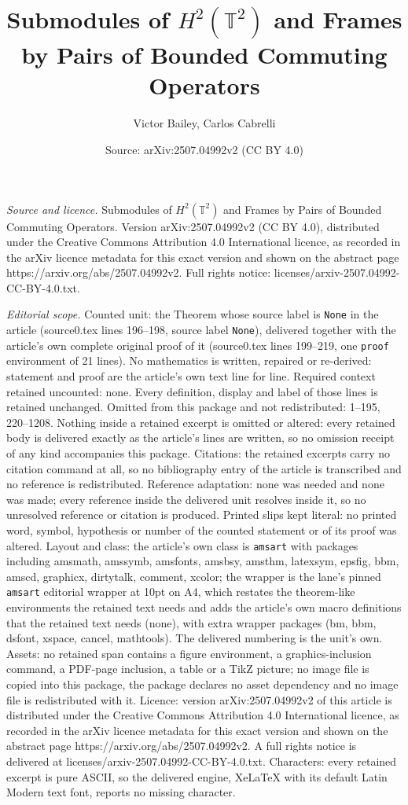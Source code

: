 \documentclass[10pt,a4paper]{amsart}
\title[Submodules of $H^2(\mathbb{T}^2)$ and Frames by Pairs of Bou]{Submodules of $H^2(\mathbb{T}^2)$ and Frames by Pairs of Bounded Commuting Operators}
\author{Victor Bailey, Carlos Cabrelli}
\date{Source: arXiv:2507.04992v2 (CC BY 4.0)}
\begin{document}
\maketitle

\noindent\emph{Source and licence.} Submodules of $H^2(\mathbb{T}^2)$ and Frames by Pairs of Bounded Commuting Operators. Version arXiv:2507.04992v2 (CC BY 4.0), distributed under the Creative Commons Attribution 4.0 International licence, as recorded in the arXiv licence metadata for this exact version and shown on the abstract page https://arxiv.org/abs/2507.04992v2. Full rights notice: licenses/arxiv-2507.04992-CC-BY-4.0.txt.\par\smallskip

\noindent\textit{Editorial scope.} Counted unit: the Theorem whose source label is \texttt{None} in the article (source0.tex lines 196--198, source label \texttt{None}), delivered together with the article's own complete original proof of it (source0.tex lines 199--219, one \texttt{proof} environment of 21 lines). No mathematics is written, repaired or re-derived: statement and proof are the article's own text line for line. Required context retained uncounted: none. Every definition, display and label of those lines is retained unchanged. Omitted from this package and not redistributed: 1--195, 220--1208. Nothing inside a retained excerpt is omitted or altered: every retained body is delivered exactly as the article's lines are written, so no omission receipt of any kind accompanies this package. Citations: the retained excerpts carry no citation command at all, so no bibliography entry of the article is transcribed and no reference is redistributed. Reference adaptation: none was needed and none was made; every reference inside the delivered unit resolves inside it, so no unresolved reference or citation is produced. Printed slips kept literal: no printed word, symbol, hypothesis or number of the counted statement or of its proof was altered. Layout and class: the article's own class is \texttt{amsart} with packages including amsmath, amssymb, amsfonts, amsbsy, amsthm, latexsym, epsfig, bbm, amscd, graphicx, dirtytalk, comment, xcolor; the wrapper is the lane's pinned \texttt{amsart} editorial wrapper at 10pt on A4, which restates the theorem-like environments the retained text needs and adds the article's own macro definitions that the retained text needs (none), with extra wrapper packages (bm, bbm, dsfont, xspace, cancel, mathtools). The delivered numbering is the unit's own. Assets: no retained span contains a figure environment, a graphics-inclusion command, a PDF-page inclusion, a table or a TikZ picture; no image file is copied into this package, the package declares no asset dependency and no image file is redistributed with it. Licence: version arXiv:2507.04992v2 of this article is distributed under the Creative Commons Attribution 4.0 International licence, as recorded in the arXiv licence metadata for this exact version and shown on the abstract page https://arxiv.org/abs/2507.04992v2. A full rights notice is delivered at licenses/arxiv-2507.04992-CC-BY-4.0.txt. Characters: every retained excerpt is pure ASCII, so the delivered engine, XeLaTeX with its default Latin Modern text font, reports no missing character.
\end{document}
